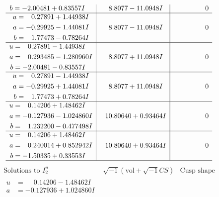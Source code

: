 \documentclass[1p]{elsarticle_modified}
\theoremstyle{definition}
\newcommand{\I}{\sqrt{-1}}
\begin{document}
$$\begin{array}{c|c|c}
\begin{aligned}
b &= -2.00481 + 0.83557 I\end{aligned}
 & \phantom{-}8.8077 - 11.0948 I & \phantom{-0.000000 } 0 \\ \hline\begin{aligned}
u &= \phantom{-}0.27891 + 1.44938 I \\
a &= -0.29925 - 1.44081 I \\
b &= \phantom{-}1.77473 - 0.78264 I\end{aligned}
 & \phantom{-}8.8077 - 11.0948 I & \phantom{-0.000000 } 0 \\ \hline\begin{aligned}
u &= \phantom{-}0.27891 - 1.44938 I \\
a &= \phantom{-}0.293485 - 1.280960 I \\
b &= -2.00481 - 0.83557 I\end{aligned}
 & \phantom{-}8.8077 + 11.0948 I & \phantom{-0.000000 } 0 \\ \hline\begin{aligned}
u &= \phantom{-}0.27891 - 1.44938 I \\
a &= -0.29925 + 1.44081 I \\
b &= \phantom{-}1.77473 + 0.78264 I\end{aligned}
 & \phantom{-}8.8077 + 11.0948 I & \phantom{-0.000000 } 0 \\ \hline\begin{aligned}
u &= \phantom{-}0.14206 + 1.48462 I \\
a &= -0.127936 - 1.024860 I \\
b &= \phantom{-}1.232200 - 0.477498 I\end{aligned}
 & \phantom{-}10.80640 + 0.93464 I & \phantom{-0.000000 } 0 \\ \hline\begin{aligned}
u &= \phantom{-}0.14206 + 1.48462 I \\
a &= \phantom{-}0.240014 + 0.852942 I \\
b &= -1.50335 + 0.33553 I\end{aligned}
 & \phantom{-}10.80640 + 0.93464 I & \phantom{-0.000000 } 0\\
 \hline 
 \end{array}$$\newpage$$\begin{array}{c|c|c}  
\text{Solutions to }I^u_{2}& \I (\text{vol} + \sqrt{-1}CS) & \text{Cusp shape}\\
 \hline 
\begin{aligned}
u &= \phantom{-}0.14206 - 1.48462 I \\
a &= -0.127936 + 1.024860 I \\

\end{aligned}
\end{array}$$
\end{document}
